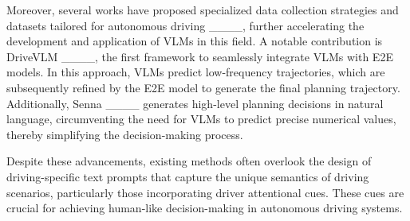 Moreover, several works have proposed specialized data collection strategies and datasets tailored for autonomous driving ____, further accelerating the development and application of VLMs in this field. A notable contribution is DriveVLM ____, the first framework to seamlessly integrate VLMs with E2E models. In this approach, VLMs predict low-frequency trajectories, which are subsequently refined by the E2E model to generate the final planning trajectory. Additionally, Senna ____ generates high-level planning decisions in natural language, circumventing the need for VLMs to predict precise numerical values, thereby simplifying the decision-making process.

Despite these advancements, existing methods often overlook the design of driving-specific text prompts that capture the unique semantics of driving scenarios, particularly those incorporating driver attentional cues. These cues are crucial for achieving human-like decision-making in autonomous driving systems.